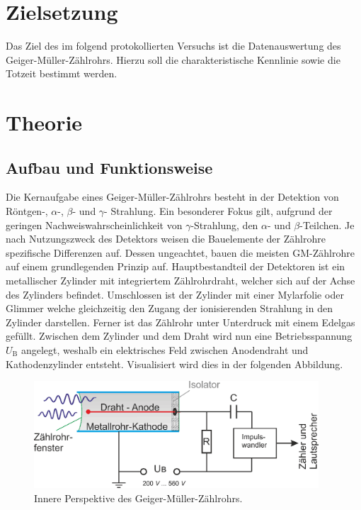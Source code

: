 %

%

\section{Zielsetzung}
\label{sec:Zielsetzung}

Das Ziel des im folgend protokollierten Versuchs ist die Datenauswertung des Geiger-Müller-Zählrohrs. Hierzu soll die 
charakteristische Kennlinie sowie die Totzeit bestimmt werden.

\section{Theorie}
\label{sec:Theorie}

\subsection{Aufbau und Funktionsweise}

\noindent Die Kernaufgabe eines Geiger-Müller-Zählrohrs besteht in der Detektion von Röntgen-, $\alpha$-, $\beta$- und $\gamma$-
Strahlung. Ein besonderer Fokus gilt, aufgrund der geringen Nachweiswahrscheinlichkeit von $\gamma$-Strahlung, den
$\alpha$- und $\beta$-Teilchen. Je nach Nutzungszweck des Detektors weisen die Bauelemente der Zählrohre spezifische 
Differenzen auf. Dessen ungeachtet, bauen die meisten GM-Zählrohre auf einem grundlegenden Prinzip auf. Hauptbestandteil 
der Detektoren ist ein metallischer Zylinder mit integriertem Zählrohrdraht, welcher sich auf der Achse des Zylinders 
befindet. Umschlossen ist der Zylinder mit einer Mylarfolie oder Glimmer welche gleichzeitig den Zugang der ionisierenden 
Strahlung in den Zylinder darstellen. Ferner ist das Zählrohr unter Unterdruck mit einem Edelgas gefüllt. Zwischen dem 
Zylinder und dem Draht wird nun eine Betriebsspannung $U_\text{B}$ angelegt, weshalb ein elektrisches Feld zwischen 
Anodendraht und Kathodenzylinder entsteht. Visualisiert wird dies in der folgenden Abbildung.

\begin{figure}
    \centering
    \includegraphics[height=4cm]{content/Aufbau1.png}
    \caption{Innere Perspektive des Geiger-Müller-Zählrohrs\cite{Aufbau1_GM}.}
    \label{fig:GM-Rohr}
\end{figure}

